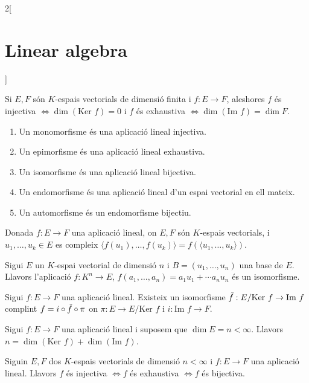 \documentclass[class=article,10pt,crop=false]{standalone}
\begin{document}
\begin{multicols}{2}[\section{Linear algebra}]
\begin{prop}
\begin{enumerate}
\end{enumerate}
\end{prop}
\begin{prop}
Si $E,F$ són $K$-espais vectorials de dimensió finita i $f:E\rightarrow F$, aleshores $f$ és injectiva $\iff \dim(\text{Ker }f)=0$ i $f$ és exhaustiva $\iff \dim(\text{Im }f)=\dim F$.
\end{prop}
\begin{definition}
\hfill
\begin{enumerate}
    \item Un monomorfisme és una aplicació lineal injectiva.
    \item Un epimorfisme és una aplicació lineal exhaustiva.
    \item Un isomorfisme és una aplicació lineal bijectiva.
    \item Un endomorfisme és una aplicació lineal d'un espai vectorial en ell mateix.
    \item Un automorfisme és un endomorfisme bijectiu.
\end{enumerate}
\end{definition}
\begin{lemma}
Donada $f:E\rightarrow F$ una aplicació lineal, on $E,F$ són $K$-espais vectorials, i $u_1,\ldots,u_k\in E$ es compleix $\langle f(u_1),\ldots,f(u_k)\rangle=f(\langle u_1,\ldots,u_k\rangle)$.
\end{lemma}
\begin{theorem}
Sigui $E$ un $K$-espai vectorial  de dimensió $n$ i $B=(u_1,\ldots,u_n)$ una base de $E$. Llavors l'aplicació $f:K^n\rightarrow E$, $f(a_1,\ldots,a_n)=a_1u_1+\cdots a_nu_n$ és un isomorfisme.
\end{theorem}
\begin{theorem}
Sigui $f:E\rightarrow F$ una aplicació lineal. Existeix un isomorfisme $\Tilde{f}:E/\text{Ker }f\rightarrow \text{Im }f$ complint $f=i\circ\Tilde{f}\circ\pi$ on $\pi:E\rightarrow E/\text{Ker }f$ i $i:\text{Im }f\rightarrow F$.
\end{theorem}
\begin{corollary}
Sigui $f:E\rightarrow F$ una aplicació lineal i suposem que $\dim E=n<\infty$. Llavors $n=\dim(\text{Ker }f)+\dim(\text{Im }f)$.
\end{corollary}
\begin{corollary}
Siguin $E,F$ dos $K$-espais vectorials de dimensió $n<\infty$ i $f:E\rightarrow F$ una aplicació lineal. Llavors $f$ és injectiva $\iff f$ és exhaustiva $\iff f$ és bijectiva.

\end{corollary}
\end{multicols}
\end{document}
